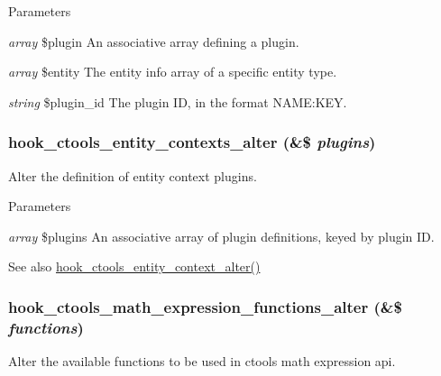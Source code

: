\begin{DoxyParams}{Parameters}
\item[{\em array}]\$plugin An associative array defining a plugin. \item[{\em array}]\$entity The entity info array of a specific entity type. \item[{\em string}]\$plugin\_\-id The plugin ID, in the format NAME:KEY. \end{DoxyParams}
\hypertarget{group__hooks_gadc7f17dbf80ddbe90f66e7e9a0abb350}{
\subsubsection[{hook\_\-ctools\_\-entity\_\-contexts\_\-alter}]{\setlength{\rightskip}{0pt plus 5cm}hook\_\-ctools\_\-entity\_\-contexts\_\-alter (\&\$ {\em plugins})}}
\label{group__hooks_gadc7f17dbf80ddbe90f66e7e9a0abb350}
Alter the definition of entity context plugins.


\begin{DoxyParams}{Parameters}
\item[{\em array}]\$plugins An associative array of plugin definitions, keyed by plugin ID.\end{DoxyParams}
\begin{DoxySeeAlso}{See also}
\hyperlink{group__hooks_gad8e0232b98d84d2347a3cc1e26c3df09}{hook\_\-ctools\_\-entity\_\-context\_\-alter()} 
\end{DoxySeeAlso}
\hypertarget{group__hooks_ga133fb5b53380291a3348feffb3dd3364}{
\subsubsection[{hook\_\-ctools\_\-math\_\-expression\_\-functions\_\-alter}]{\setlength{\rightskip}{0pt plus 5cm}hook\_\-ctools\_\-math\_\-expression\_\-functions\_\-alter (\&\$ {\em functions})}}
\label{group__hooks_ga133fb5b53380291a3348feffb3dd3364}
Alter the available functions to be used in ctools math expression api.


